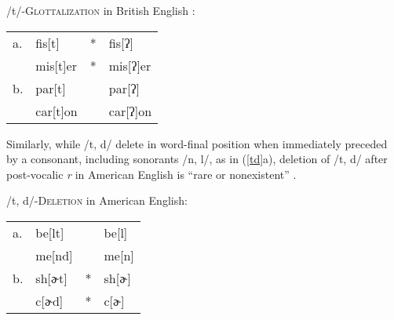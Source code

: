 \begin{example}
/t/-\textsc{Glottalization} in British English \citep[after][195, 258]{Harris1994}: 

\vspace{0.5\baselineskip}
\begin{tabular}{l l l@{} l}
a. & fis[t]   & * & fis[ʔ]   \\
   & mis[t]er & * & mis[ʔ]er \\
b. & par[t]   &   & par[ʔ]   \\
   & car[t]on &   & car[ʔ]on \\
\end{tabular}
\end{example}

\noindent
Similarly, while /t, d/ delete in word-final position when immediately preceded by a consonant, including sonorants /n, l/, as in (\ref{td}a), deletion of /t, d/ after post-vocalic \emph{r} in American English is ``rare or nonexistent'' \citep[][8]{Guy1980}. 

\begin{example}
\label{td}
/t, d/-\textsc{Deletion} in American English: 

\vspace{0.5\baselineskip}
\begin{tabular}{l l l@{} l}
a. & be[lt]  &   & be[l]  \\
   & me[nd]  &   & me[n]  \\
b. & sh[ɚt]  & * & sh[ɚ] \\
   & c[ɚd]   & * & c[ɚ]  \\
\end{tabular}
\end{example}

